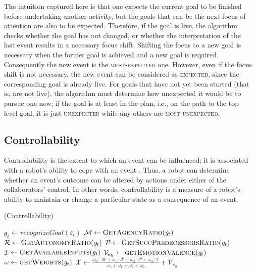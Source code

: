 The intuition captured here is that one expects the current goal to be finished
before undertaking another activity, but the goals that can be the next focus of
attention are also to be expected. Therefore, if the goal is live, the algorithm
checks whether the goal has not changed, or whether the interpretation of the
last event results in a necessary focus shift. Shifting the focus to a new goal
is necessary when the former goal is achieved and a new goal is required.
Consequently the new event is the \textsc{most-expected} one. However, even if
the focus shift is not necessary, the new event can be considered as
\textsc{expected}, since the corresponding goal is already live. For goals that
have not yet been started (that is, are not live), the algorithm must determine
how unexpected it would be to pursue one now; if the goal is at least in the
plan, i.e., on the path to the top level goal, it is just \textsc{unexpected}
while any others are \textsc{most-unexpected}.

\subsection{Controllability}
\label{sec:controllability}

Controllability is the extent to which an event can be influenced; it is
associated with a robot's ability to cope with an event
\cite{gratch:domain-independent}. Thus, a robot can determine whether an event's
outcome can be altered by actions under either of the collaborators' control. In
other words, controllability is a measure of a robot's ability to maintain or
change a particular state as a consequence of an event.

\begin{algorithm}
	\caption{(Controllability)}
	\label{alg:controllability}
	\begin{algorithmic}[1]
 			\State $\mathit{g}_{t} \gets \textit{recognizeGoal}{(\varepsilon_t)}$
  			\Statex
			\State $\mathcal{M} \gets \Call{GetAgencyRatio}{\mathit{g}_{t}}$ 
			\State $\mathcal{R} \gets \Call{GetAutonomyRatio}{\mathit{g}_{t}}$
 			\Statex
			\State $\mathcal{P} \gets \Call{GetSuccPredecessorsRatio}{\mathit{g}_{t}}$
			\State $\mathcal{I} \gets \Call{GetAvailableInputs}{\mathit{g}_{t}}$
  			\Statex
			\State $\mathcal{V}_{e_h} \gets \Call{getEmotionValence}{\mathit{g}_{t}}$ 
			\State $\omega \gets \Call{getWeights}{\mathit{g}_{t}}$
			\Statex
			\State $\mathcal{X} \gets
			\frac{\omega_{0}\cdot \mathcal{M} + \omega_{1}\cdot \mathcal{R} +
			\omega_{2}\cdot \mathcal{P} + \omega_{3}\cdot \mathcal{I}}{\omega_{0} +
			\omega_{1} + \omega_{2} + \omega_{3}} + \mathcal{V}_{e_h}$
  			\Statex
 			\Statex
 				\State {}
			\Else
 				\State {}
			\EndIf
		\EndFunction
	\end{algorithmic}
\end{algorithm}

